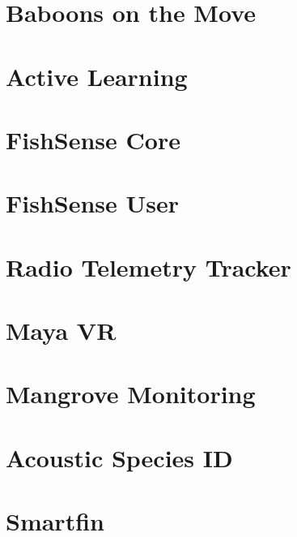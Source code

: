 \section{Baboons on the Move}

\section{Active Learning}

\section{FishSense Core}

\section{FishSense User}

\section{Radio Telemetry Tracker}

\section{Maya VR}

\section{Mangrove Monitoring}

\section{Acoustic Species ID}

\section{Smartfin}

